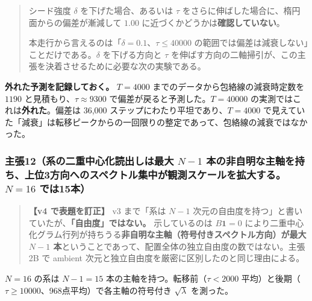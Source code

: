 \documentclass[
  10pt,
]{ltjsarticle}
\begin{document}
\begin{quote}
シード強度 \(\delta\) を下げた場合、あるいは \(\tau\)
をさらに伸ばした場合に、楕円面からの偏差が漸減して \(1.00\)
に近づくかどうかは\textbf{確認していない}。

本走行から言えるのは「\(\delta = 0.1\)、\(\tau \le 40000\)
の範囲では偏差は減衰しない」ことだけである。\(\delta\) を下げる方向と
\(\tau\)
を伸ばす方向の二軸掃引が、この主張を決着させるために必要な次の実験である。
\end{quote}

\textbf{外れた予測を記録しておく。} \(T = 4000\)
までのデータから包絡線の減衰時定数を \(1190\)
と見積もり、\(\tau \approx 9300\) で偏差が戻ると予測した。\(T = 40000\)
の実測ではこれは\textbf{外れた}。偏差は 36,000
ステップにわたり平坦であり、\(T=4000\)
で見えていた「減衰」は転移ピークからの一回限りの整定であって、包絡線の減衰ではなかった。

\subsubsection{\texorpdfstring{主張12（系の二重中心化読出しは最大
\(N-1\)
本の非自明な主軸を持ち、上位3方向へのスペクトル集中が観測スケールを拡大する。\(N=16\)
では15本）}{主張12（系の二重中心化読出しは最大 N-1 本の非自明な主軸を持ち、上位3方向へのスペクトル集中が観測スケールを拡大する。N=16 では15本）}}\label{ux4e3bux5f3512ux7cfbux306eux4e8cux91cdux4e2dux5fc3ux5316ux8aadux51faux3057ux306fux6700ux5927-n-1-ux672cux306eux975eux81eaux660eux306aux4e3bux8ef8ux3092ux6301ux3061ux4e0aux4f4d3ux65b9ux5411ux3078ux306eux30b9ux30daux30afux30c8ux30ebux96c6ux4e2dux304cux89b3ux6e2cux30b9ux30b1ux30fcux30ebux3092ux62e1ux5927ux3059ux308bn16-ux3067ux306f15ux672c}

\begin{quote}
\textbf{【v4 で表題を訂正】} v3 まで「系は \(N-1\)
次元の自由度を持つ」と書いていたが、\textbf{「自由度」ではない。}
示しているのは \(B\mathbf{1}=0\)
により二重中心化グラム行列が持ちうる\textbf{非自明な主軸（符号付きスペクトル方向）が最大
\(N-1\) 本}ということであって、配置全体の独立自由度の数ではない。主張2B
で ambient 次元と独立自由度を厳密に区別したのと同じ理由による。
\end{quote}

\(N = 16\) の系は \(N-1 = 15\) 本の主軸を持つ。転移前（\(\tau < 2000\)
平均）と後期（\(\tau \ge 10000\)、968点平均）で各主軸の符号付き
\(\sqrt{\lambda}\) を測った。
\end{document}
